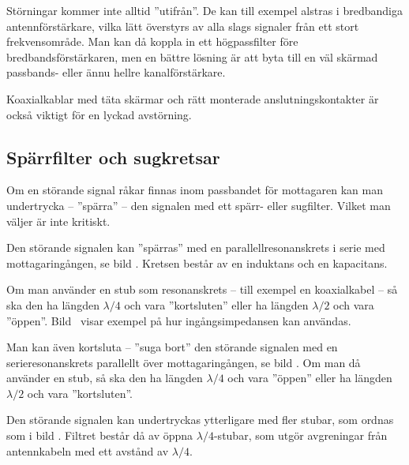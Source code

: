 Störningar kommer inte alltid ''utifrån''.
De kan till exempel alstras i bredbandiga antennförstärkare, vilka lätt
överstyrs av alla slags signaler från ett stort frekvensområde.
Man kan då koppla in ett högpassfilter före bredbandsförstärkaren, men en
bättre lösning är att byta till en väl skärmad passbands- eller ännu hellre
kanalförstärkare.

Koaxialkablar med täta skärmar och rätt monterade anslutningskontakter är också
viktigt för en lyckad avstörning.

\clearpage
{}

\subsection{Spärrfilter och sugkretsar}
\label{spärrfilter}
\label{Sugkretsar}


Om en störande signal råkar finnas inom passbandet för mottagaren kan
man undertrycka -- ''spärra'' -- den signalen med ett spärr- eller sugfilter.
Vilket man väljer är inte kritiskt.

Den störande signalen kan ''spärras'' med en parallellresonanskrets i
serie med mottagaringången, se bild .
Kretsen består av en induktans och en kapacitans.

Om man använder en stub som resonanskrets -- till exempel en koaxialkabel -- så
ska den ha längden \(\lambda/4\) och vara ''kortsluten'' eller ha
längden \(\lambda/2\) och vara ''öppen''.  Bild~ visar exempel
på hur ingångsimpedansen kan användas.

Man kan även kortsluta -- ''suga bort'' den störande signalen med en
serieresonanskrets parallellt över mottagaringången, se bild .
Om man då använder en stub, så ska den ha längden \(\lambda/4\) och
vara ''öppen'' eller ha längden \(\lambda/2\) och vara ''kortsluten''.

Den störande signalen kan undertryckas ytterligare med fler stubar,
som ordnas som i bild .
Filtret består då av öppna \(\lambda/4\)-stubar, som utgör avgreningar från
antennkabeln med ett avstånd av \(\lambda/4\).

